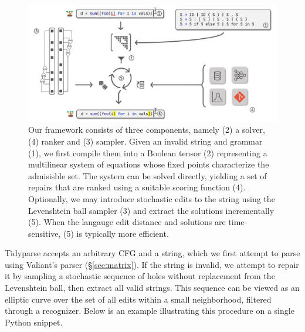 \documentclass[sigplan,review,anonymous,acmsmall]{acmart}\settopmatter{printfolios=false,printccs=false,printacmref=false}
\begin{document}
\begin{figure}
  \centering
  \includegraphics[width=\linewidth]{../figures/architecture_overview.pdf}
  \caption{Our framework consists of three components, namely (2) a solver, (4) ranker and (3) sampler. Given an invalid string and grammar (1), we first compile them into a Boolean tensor (2) representing a multilinear system of equations whose fixed points characterize the admisisble set. The system can be solved directly, yielding a set of repairs that are ranked using a suitable scoring function (4). Optionally, we may introduce stochastic edits to the string using the Levenshtein ball sampler (3) and extract the solutions incrementally (5). When the langauge edit distance and solutions are time-sensitive, (5) is typically more efficient.}
  \label{fig:overview}
\end{figure}

Tidyparse accepts an arbitrary CFG and a string, which we first attempt to parse using Valiant's parser (\S\ref{sec:matrix}). If the string is invalid, we attempt to repair it by sampling a stochastic sequence of holes without replacement from the Levenshtein ball, then extract all valid strings. This sequence can be viewed as an elliptic curve over the set of all edits within a small neighborhood, filtered through a recognizer. Below is an example illustrating this procedure on a single Python snippet.
\end{document}
